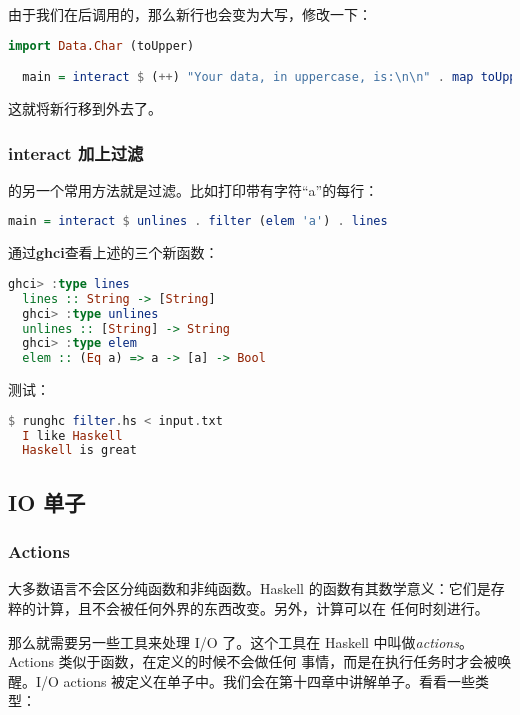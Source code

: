 \documentclass[./main.tex]{subfiles}
\begin{document}
由于我们在\acode{(++)}后调用的，那么新行也会变为大写，修改一下：

\begin{lstlisting}[language=Haskell]
  import Data.Char (toUpper)

  main = interact $ (++) "Your data, in uppercase, is:\n\n" . map toUpper
\end{lstlisting}

这就将新行移到外去了。

\subsubsection*{interact 加上过滤}

的另一个常用方法就是过滤。比如打印带有字符“a”的每行：

\begin{lstlisting}[language=Haskell]
  main = interact $ unlines . filter (elem 'a') . lines
\end{lstlisting}

通过\textbf{ghci}查看上述的三个新函数：

\begin{lstlisting}[language=Haskell]
  ghci> :type lines
  lines :: String -> [String]
  ghci> :type unlines
  unlines :: [String] -> String
  ghci> :type elem
  elem :: (Eq a) => a -> [a] -> Bool
\end{lstlisting}

测试：

\begin{lstlisting}[language=Haskell]
  $ runghc filter.hs < input.txt
  I like Haskell
  Haskell is great
\end{lstlisting}

\subsection*{IO 单子}

\subsubsection*{Actions}

大多数语言不会区分纯函数和非纯函数。Haskell 的函数有其数学意义：它们是存粹的计算，且不会被任何外界的东西改变。另外，计算可以在
任何时刻进行。

那么就需要另一些工具来处理 I/O 了。这个工具在 Haskell 中叫做\textit{actions}。Actions 类似于函数，在定义的时候不会做任何
事情，而是在执行任务时才会被唤醒。I/O actions 被定义在单子中。我们会在第十四章中讲解单子。看看一些类型：
\end{document}
